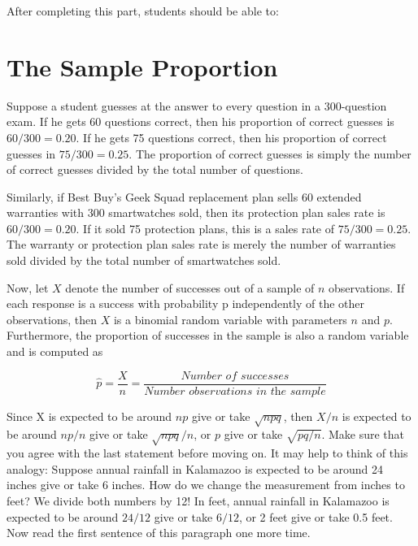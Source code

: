 \documentclass[11pt, chapterprefix=true]{scrbook}\usepackage[]{graphicx}\usepackage[]{color}
\begin{document}
After completing this part, students should be able to:


\section{The Sample Proportion}

Suppose a student guesses at the answer to every question in a 300-question exam.  If he gets 60 questions correct, then his proportion of correct guesses is $60/300 = 0.20$.  If he gets 75 questions correct, then his proportion of correct guesses in $75/300 = 0.25$.  The proportion of correct guesses is simply the number of correct guesses divided by the total number of questions.

Similarly, if Best Buy's Geek Squad replacement plan sells 60 extended warranties with 300 smartwatches sold, then its protection plan sales rate is $60/300 = 0.20$. If it sold 75 protection plans, this is a sales rate of $75/300 = 0.25$.  The warranty or protection plan sales rate is merely the number of warranties sold divided by the total number of smartwatches sold.

Now, let $X$ denote the number of successes out of a sample of $n$ observations. If each response is a success with probability p independently of the other observations, then $X$ is a binomial random variable with parameters $n$ and $p$.  Furthermore, the proportion of successes in the sample is also a random variable and is computed as

\begin{equation*}
  \hat{p} = \frac{X}{n} = \frac{\textit{Number of successes}}{\textit{Number observations in the sample}}
\end{equation*}

Since X is expected to be around $np$ give or take $\sqrt{npq}$, then $X/n$ is expected to be around $np/n$ give or take $\sqrt{npq}/n$, or $p$ give or take $\sqrt{pq/n}$.  Make sure that you agree with the last statement before moving on.  It may help to think of this analogy: Suppose annual rainfall in Kalamazoo is expected to be around 24 inches give or take 6 inches.  How do we change the measurement from inches to feet?  We divide both numbers by 12! In feet, annual rainfall in Kalamazoo is expected to be around $24/12$ give or take $6/12$, or 2 feet give or take 0.5 feet.  Now read the first sentence of this paragraph one more time.
\end{document}

